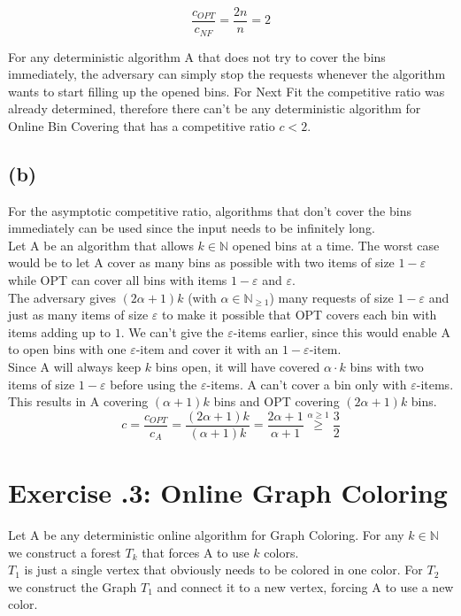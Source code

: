 \documentclass[a4paper,12pt]{scrartcl}
\newcommand{\N}{\ensuremath{\mathbb{N}}}
\newcommand{\mal}{\cdot}
\renewcommand{\epsilon}{\varepsilon}
\newcounter{sheet}
\newcommand{\printsheet}{\arabic{sheet}}
\begin{document}
\[\frac{c_{OPT}}{c_{NF}} = \frac{2n}{n} = 2\]

For any deterministic algorithm A that does not try to cover the bins immediately, the adversary can simply stop the requests whenever the algorithm wants to start filling up the opened bins. For Next Fit the competitive ratio was already determined, therefore there can't be any deterministic algorithm for Online Bin Covering that has a competitive ratio $c < 2$.

\subsection*{(b)}
For the asymptotic competitive ratio, algorithms that don't cover the bins immediately can be used since the input needs to be infinitely long.\\

Let A be an algorithm that allows $k \in \N$ opened bins at a time. The worst case would be to let A cover as many bins as possible with two items of size $1-\epsilon$ while OPT can cover all bins with items $1-\epsilon$ and $\epsilon$. \\

The adversary gives $(2\alpha + 1)k$ (with $\alpha \in \N_{\geq 1}$) many requests of size $1-\epsilon$ and just as many items of size $\epsilon$ to make it possible that OPT covers each bin with items adding up to $1$. We can't give the $\epsilon$-items earlier, since this would enable A to open bins with one $\epsilon$-item and cover it with an $1-\epsilon$-item. \\
Since A will always keep $k$ bins open, it will have covered $\alpha \mal k$ bins with two items of size $1-\epsilon$ before using the $\epsilon$-items. A can't cover a bin only with $\epsilon$-items. \\

This results in A covering $(\alpha + 1) k$ bins and OPT covering $(2\alpha + 1)k$ bins.
\[c = \frac{c_{OPT}}{c_A} = \frac{(2\alpha + 1)k}{(\alpha+1)k}= \frac{2\alpha + 1}{\alpha + 1} \overset{\alpha \geq 1}{\geq} \frac{3}{2} \] 


\section*{Exercise \printsheet.3: Online Graph Coloring}
Let A be any deterministic online algorithm for Graph Coloring. For any $k \in \N$ we construct a forest $T_k$ that forces A to use $k$ colors.\\
$T_1$ is just a single vertex that obviously needs to be colored in one color.
For $T_2$ we construct the Graph $T_1$ and connect it to a new vertex, forcing A to use a new color. \\
\end{document}

